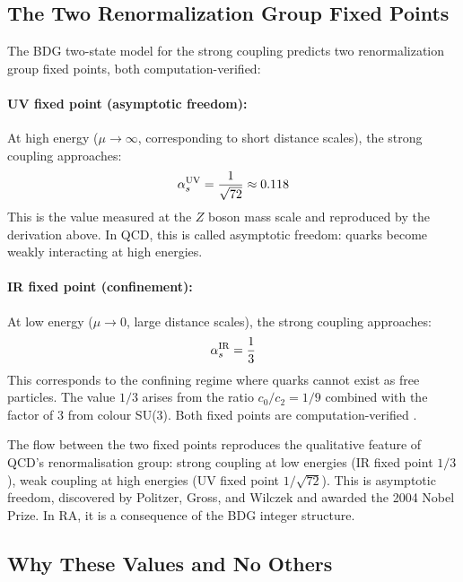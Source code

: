 \documentclass[12pt,a4paper]{article}
\begin{document}
\subsection{The Two Renormalization Group Fixed Points}

The BDG two-state model for the strong coupling predicts two renormalization group fixed points, both computation-verified:

\paragraph{UV fixed point (asymptotic freedom):}  At high energy ($\mu\to\infty$, corresponding to short distance scales), the strong coupling approaches:
\begin{equation}
  \alpha_s^{\rm UV} = \frac{1}{\sqrt{72}}\approx0.118
  \label{eq:alphas_UV}
\end{equation}
This is the value measured at the $Z$ boson mass scale and reproduced by the derivation above.  In QCD, this is called asymptotic freedom: quarks become weakly interacting at high energies.

\paragraph{IR fixed point (confinement):}  At low energy ($\mu\to0$, large distance scales), the strong coupling approaches:
\begin{equation}
  \alpha_s^{\rm IR} = \frac{1}{3}
  \label{eq:alphas_IR}
\end{equation}
This corresponds to the confining regime where quarks cannot exist as free particles.  The value $1/3$ arises from the ratio $c_0/c_2=1/9$ combined with the factor of $3$ from colour SU(3).  Both fixed points are computation-verified \statusCV.

The flow between the two fixed points reproduces the qualitative feature of QCD's renormalisation group: strong coupling at low energies (IR fixed point $1/3$), weak coupling at high energies (UV fixed point $1/\sqrt{72}$).  This is asymptotic freedom, discovered by Politzer, Gross, and Wilczek \cite{Politzer1973,Gross1973} and awarded the 2004 Nobel Prize.  In RA, it is a consequence of the BDG integer structure.

\subsection{Why These Values and No Others}
\end{document}
